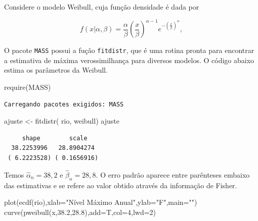 \documentclass[
  letterpaper,
  DIV=11,
  numbers=noendperiod]{scrartcl}
\newenvironment{Shaded}{\begin{snugshade}}{\end{snugshade}}
\newcommand{\AttributeTok}[1]{\textcolor[rgb]{0.40,0.45,0.13}{#1}}
\newcommand{\DecValTok}[1]{\textcolor[rgb]{0.68,0.00,0.00}{#1}}
\newcommand{\FloatTok}[1]{\textcolor[rgb]{0.68,0.00,0.00}{#1}}
\newcommand{\FunctionTok}[1]{\textcolor[rgb]{0.28,0.35,0.67}{#1}}
\newcommand{\NormalTok}[1]{\textcolor[rgb]{0.00,0.23,0.31}{#1}}
\newcommand{\OtherTok}[1]{\textcolor[rgb]{0.00,0.23,0.31}{#1}}
\newcommand{\StringTok}[1]{\textcolor[rgb]{0.13,0.47,0.30}{#1}}
\begin{document}
Considere o modelo Weibull, cuja função densidade é dada por

\[f(x|\alpha,\beta)=\frac{\alpha}{\beta}\left(\frac{x}{\beta}\right)^{\alpha-1}e^{-\left(\frac{x}{\beta}\right)^\alpha},\]

O pacote \texttt{MASS} possui a fução \texttt{fitdistr}, que é uma
rotina pronta para encontrar a estimativa de máxima verossimilhança para
diversos modelos. O código abaixo estima os parâmetros da Weibull.

\begin{Shaded}
\begin{Highlighting}[]
\FunctionTok{require}\NormalTok{(MASS)}
\end{Highlighting}
\end{Shaded}

\begin{verbatim}
Carregando pacotes exigidos: MASS
\end{verbatim}

\begin{Shaded}
\begin{Highlighting}[]
\NormalTok{ajuste }\OtherTok{\textless{}{-}} \FunctionTok{fitdistr}\NormalTok{( rio, }\StringTok{\textquotesingle{}weibull\textquotesingle{}}\NormalTok{)}
\NormalTok{ajuste}
\end{Highlighting}
\end{Shaded}

\begin{verbatim}
     shape        scale   
  38.2253996   28.8904274 
 ( 6.2223528) ( 0.1656916)
\end{verbatim}

Temos \(\hat{\alpha}_n=38,2\) e \(\hat{\beta}_n=28,8\). O erro padrão
aparece entre parênteses embaixo das estimativas e se refere ao valor
obtido através da informação de Fisher.

\begin{Shaded}
\begin{Highlighting}[]
\FunctionTok{plot}\NormalTok{(}\FunctionTok{ecdf}\NormalTok{(rio),}\AttributeTok{xlab=}\StringTok{"Nível Máximo Anual"}\NormalTok{,}\AttributeTok{ylab=}\StringTok{"F"}\NormalTok{,}\AttributeTok{main=}\StringTok{""}\NormalTok{)}
\FunctionTok{curve}\NormalTok{(}\FunctionTok{pweibull}\NormalTok{(x,}\FloatTok{38.2}\NormalTok{,}\FloatTok{28.8}\NormalTok{),}\AttributeTok{add=}\NormalTok{T,}\AttributeTok{col=}\DecValTok{4}\NormalTok{,}\AttributeTok{lwd=}\DecValTok{2}\NormalTok{) }
\end{Highlighting}
\end{Shaded}
\end{document}
